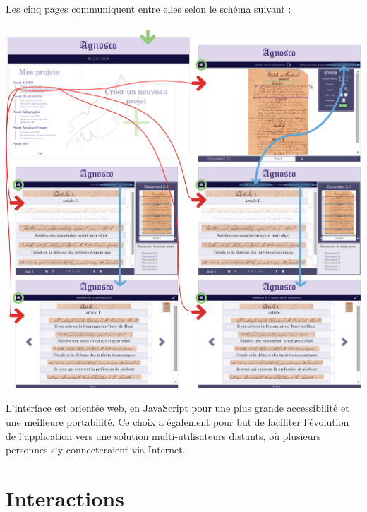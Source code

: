 \paragraph{}
Les cinq pages communiquent entre elles selon le schéma suivant :

\paragraph{}
\begin{mdframed}[frametitle={Figure 15 : Hiérarchie entre les pages}, innerbottommargin=10]
\begin{center}
\includegraphics[scale=0.6]{ihm6.png}
\end{center}
\end{mdframed}

L’interface est orientée web, en JavaScript pour une plus grande accessibilité 
et une meilleure portabilité. Ce choix a également pour but de faciliter 
l’évolution de l’application vers une solution multi-utilisateurs distants, 
où plusieurs personnes s‘y connecteraient via Internet.

\section{Interactions}


